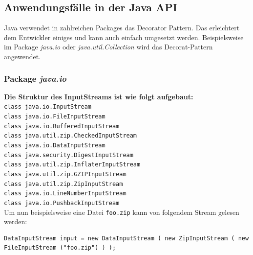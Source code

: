 	\subsection{Anwendungsfälle in der Java API}
	Java verwendet in zahlreichen Packages das Decorator Pattern.
	Das erleichtert dem Entwickler einiges und kann auch einfach umgesetzt werden. Beispielsweise im Package \textit{java.io} oder \textit{java.util.Collection} wird das Decorat-Pattern angewendet.
	
	\subsubsection{Package \textit{java.io}}
	\textbf{Die Struktur des InputStreams ist wie folgt aufgebaut:\cite{javaApi}}
	\vspace{5mm}
	\texttt{
		\\class java.io.InputStream\\
		\hspace*{20mm} class java.io.FileInputStream\\
		\hspace*{40mm} class java.io.BufferedInputStream\\
		\hspace*{40mm} class java.util.zip.CheckedInputStream\\ 
		\hspace*{40mm} class java.io.DataInputStream\\ 
		\hspace*{40mm} class java.security.DigestInputStream\\
		\hspace*{40mm} class java.util.zip.InflaterInputStream\\
		\hspace*{60mm} class java.util.zip.GZIPInputStream\\
		\hspace*{60mm} class java.util.zip.ZipInputStream\\
		\hspace*{40mm} class java.io.LineNumberInputStream\\
		\hspace*{40mm}  class java.io.PushbackInputStream\\
	}
	Um nun beispielsweise eine Datei \texttt{foo.zip} kann von folgendem Stream gelesen werden:
	
	\begin{lstlisting}[style=JavaG, caption=Example Decorator java.io \cite{decoratorDebug}]
	DataInputStream input = new DataInputStream ( new ZipInputStream ( new FileInputStream ("foo.zip") ) );
	\end{lstlisting}
	
